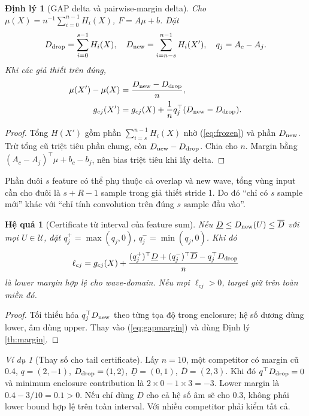 \documentclass[11pt,a4paper]{article}
\newcommand{\Uset}{\mathcal U}
\newtheorem{theorem}[definition]{Định lý}
\newtheorem{corollary}[definition]{Hệ quả}
\theoremstyle{remark}
\newtheorem{example}[definition]{Ví dụ}
\begin{document}
\begin{theorem}[GAP delta và pairwise-margin delta]\label{th:gap}
Cho $\mu(X)=n^{-1}\sum_{i=0}^{n-1}H_i(X)$, $F=A\mu+b$. Đặt
\begin{equation}
 D_{\rm drop}=\sum_{i=0}^{s-1}H_i(X),\quad
 D_{\rm new}=\sum_{i=n-s}^{n-1}H_i(X'),\quad q_j=A_c-A_j.
\end{equation}
Khi các giả thiết trên đúng,
\begin{align}
 \mu(X')-\mu(X)&=\frac{D_{\rm new}-D_{\rm drop}}n,\\
 g_{cj}(X')&=g_{cj}(X)+\frac1nq_j^\top(D_{\rm new}-D_{\rm drop}).
 \label{eq:gapmargin}
\end{align}
\end{theorem}
\begin{proof}
Tổng $H(X')$ gồm phần $\sum_{i=s}^{n-1}H_i(X)$ nhờ
(\ref{eq:frozen}) và phần $D_{\rm new}$. Trừ tổng cũ triệt tiêu phần chung,
còn $D_{\rm new}-D_{\rm drop}$. Chia cho $n$. Margin bằng
$(A_c-A_j)^\top\mu+b_c-b_j$, nên bias triệt tiêu khi lấy delta.
\end{proof}
Phần đuôi $s$ feature có thể phụ thuộc cả overlap và new wave, tổng vùng
input cần cho đuôi là $s+R-1$ sample trong giả thiết stride 1. Do đó
``chỉ có $s$ sample mới'' khác với ``chỉ tính convolution trên đúng $s$
sample đầu vào''.

\begin{corollary}[Certificate từ interval của feature sum]\label{cor:interval}
Nếu $\underline D\le D_{\rm new}(U)\le\overline D$ với mọi
$U\in\Uset$, đặt $q_j^+=\max(q_j,0)$, $q_j^-=\min(q_j,0)$. Khi đó
\begin{equation}
 \ell_{cj}=g_{cj}(X)+\frac{(q_j^+)^\top\underline D
 +(q_j^-)^\top\overline D-q_j^\top D_{\rm drop}}n
 \label{eq:tail-cert}
\end{equation}
là lower margin hợp lệ cho wave-domain. Nếu mọi $\ell_{cj}>0$, target giữ
trên toàn miền đó.
\end{corollary}
\begin{proof}
Tối thiểu hóa $q_j^\top D_{\rm new}$ theo từng tọa độ trong enclosure;
hệ số dương dùng lower, âm dùng upper. Thay vào (\ref{eq:gapmargin}) và
dùng Định lý \ref{th:margin}.
\end{proof}

\begin{example}[Thay số cho tail certificate]
Lấy $n=10$, một competitor có margin cũ 0.4, $q=(2,-1)$,
$D_{\rm drop}=(1,2)$, $\underline D=(0,1)$, $\overline D=(2,3)$.
Khi đó $q^\top D_{\rm drop}=0$ và minimum enclosure contribution là
$2\times0-1\times3=-3$. Lower margin là $0.4-3/10=0.1>0$.
Nếu chỉ dùng $\underline D$ cho cả hệ số âm sẽ cho $0.3$, không phải lower
bound hợp lệ trên toàn interval. Với nhiều competitor phải kiểm tất cả.
\end{example}
\end{document}

